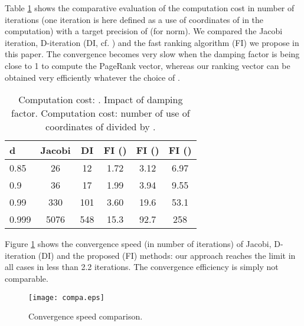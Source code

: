 \documentclass[conference]{IEEEtran}
\begin{document}
\begin{psfrags}
Table \ref{tab:1000} shows the comparative evaluation of the computation cost in number of
iterations (one iteration is here defined as a use of  coordinates of  in the computation)
with a target precision of  (for  norm).
We compared the Jacobi iteration, D-iteration (DI, cf. \cite{d-algo}) and the fast ranking algorithm
(FI) we propose in this paper. The convergence becomes very slow when the damping factor  is being
close to 1 to compute the PageRank vector, whereas our ranking vector can be obtained very
efficiently whatever the choice of .
\begin{table}
\begin{center}
\begin{tabular}{|l|ccccc|}
\hline
d        & Jacobi  & DI   & FI () & FI () & FI ()\\
\hline
0.85     & 26      & 12   & 1.72 & 3.12 & 6.97\\
0.9      & 36      & 17   & 1.99 & 3.94 & 9.55\\
0.99     & 330     & 101  & 3.60 & 19.6 & 53.1\\
0.999    & 5076    & 548  & 15.3 & 92.7 & 258\\
\hline
\end{tabular}\caption{Computation cost: . Impact of damping factor. Computation cost: number of use of coordinates of  divided by .}\label{tab:1000}
\end{center}
\end{table}

Figure \ref{fig:compa} shows the convergence speed (in number of iterations) of Jacobi, D-iteration (DI) and
the proposed (FI) methods: our approach reaches the limit in all cases in less than 2.2 iterations.
The convergence efficiency is simply not comparable.
\begin{figure}[htbp]
\centering
\texttt{[image: compa.eps]}
\caption{Convergence speed comparison.}
\label{fig:compa}
\end{figure}


\end{psfrags}
\end{document}
